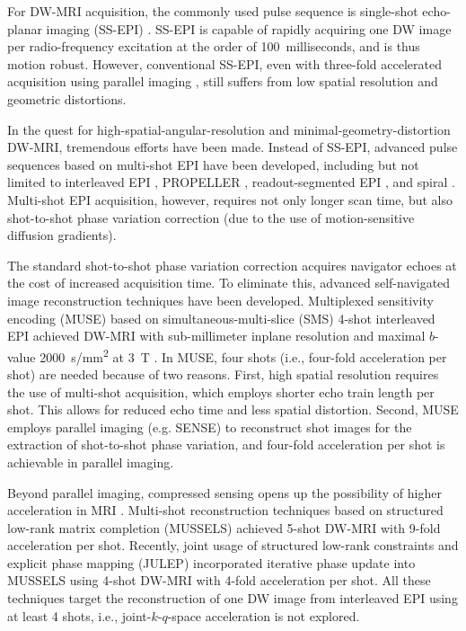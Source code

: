 \documentclass[preprint,12pt,authoryear,review]{elsarticle}
\begin{document}
	For DW-MRI acquisition, the commonly used pulse sequence is
	single-shot echo-planar imaging (SS-EPI) \citep{mansfield_1977_epi}.
	SS-EPI is capable of rapidly acquiring one DW image per radio-frequency excitation
	at the order of 100~milliseconds, and is thus motion robust.
	However, conventional SS-EPI,
	even with three-fold accelerated acquisition \citep{bammer_2001_epi_sense}
	using parallel imaging
        \citep{roemer_1990_pi,ra_1993_sense,pruessmann_1999_sense,griswold_2002_grappa},
	still suffers from low spatial resolution and geometric distortions.

	In the quest for high-spatial-angular-resolution and minimal-geometry-distortion DW-MRI,
	tremendous efforts have been made.
	Instead of SS-EPI, advanced pulse sequences based on multi-shot EPI have been developed,
	including but not limited to interleaved EPI \citep{butts_1993_iepi},
	PROPELLER \citep{pipe_2002_blade},
	readout-segmented EPI \citep{porter_2009_resolve,heidemann_2010_resolve7t}, and
	spiral \citep{truong_2014_spiral}.
	Multi-shot EPI acquisition, however, requires not only longer scan time,
	but also shot-to-shot phase variation correction
	(due to the use of motion-sensitive diffusion gradients).

	The standard shot-to-shot phase variation correction acquires navigator echoes
        at the cost of increased acquisition time.
	To eliminate this,
	advanced self-navigated image reconstruction techniques have been developed.
	Multiplexed sensitivity encoding (MUSE)
	based on simultaneous-multi-slice (SMS)
        \citep{maudsley_1980_sms,breuer_2005_caipi} 4-shot interleaved EPI
	achieved DW-MRI with sub-millimeter inplane resolution
	and maximal $b$-value \SI{2000}{s/mm^2} at \SI{3}{\tesla} \citep{chen_2013_muse}.
        In MUSE, four shots (i.e., four-fold acceleration per shot) are needed because of two reasons.
        First, high spatial resolution requires the use of multi-shot acquisition,
        which employs shorter echo train length per shot.
        This allows for reduced echo time and less spatial distortion.
        Second, MUSE employs parallel imaging (e.g. SENSE) to reconstruct shot images
        for the extraction of shot-to-shot phase variation,
        and four-fold acceleration per shot is achievable in parallel imaging.

	Beyond parallel imaging, compressed sensing
	opens up the possibility of higher acceleration in MRI
	\citep{lustig_2007_cs,block_2007_cs}.
	Multi-shot reconstruction techniques based on structured low-rank matrix completion (MUSSELS)
	\citep{mani_2017_mussels,bilgic_2019_neatr} achieved
	5-shot DW-MRI with 9-fold acceleration per shot.
	Recently, joint usage of structured low-rank constraints and explicit phase mapping (JULEP)
	\citep{dai_2023_julep} incorporated iterative phase update into MUSSELS
	using 4-shot DW-MRI with 4-fold acceleration per shot.
	All these techniques target the reconstruction of one DW image
	from interleaved EPI using at least 4 shots,
	i.e., joint-$k$-$q$-space acceleration is not explored.
\end{document}
